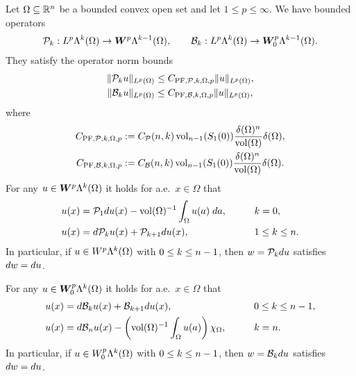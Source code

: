 \documentclass[10pt,a4paper]{article}
\begin{document}
\begin{theorem}\label{theorem:bogovpoinc}
    Let $\Omega \subseteq {\mathbb R}^{n}$ be a bounded convex open set and let $1 \leq p \leq \infty$. 
    We have bounded operators 
    \begin{align*}
        {\mathcal P}_{k} : L^{p}\Lambda^{k}(\Omega) \rightarrow \bm{W}^{p}\Lambda^{k-1}(\Omega)
        ,
        \qquad 
        {\mathcal B}_{k} : L^{p}\Lambda^{k}(\Omega) \rightarrow \bm{W}^{p}_{0}\Lambda^{k-1}(\Omega)
        .
    \end{align*}
    They satisfy the operator norm bounds 
    \begin{align*}
        \| {\mathcal P}_{k} u \|_{L^{p}(\Omega)}
        &\leq 
        C_{{{\rm PF}},{\mathcal P},k,\Omega,p}
        \| u \|_{L^{p}(\Omega)}
        ,
        \\
        \| {\mathcal B}_{k} u \|_{L^{p}(\Omega)}
        &\leq 
        C_{{{\rm PF}},{\mathcal B},k,\Omega,p}
        \| u \|_{L^{p}(\Omega)}
        ,
    \end{align*}
    where 
    \begin{align}
        C_{{{\rm PF}},{\mathcal P},k,\Omega,p} &:= C_{{\mathcal P}}(n,k) \operatorname{vol}_{n-1}(S_{1}(0)) \frac{{\delta}(\Omega)^{n}}{\operatorname{vol}(\Omega)} {\delta}(\Omega)
        ,
        \\
        C_{{{\rm PF}},{\mathcal B},k,\Omega,p} &:= C_{{\mathcal B}}(n,k) \operatorname{vol}_{n-1}(S_{1}(0)) \frac{{\delta}(\Omega)^{n}}{\operatorname{vol}(\Omega)} {\delta}(\Omega)
        .
    \end{align}
    For any $u \in \bm{W}^{p}\Lambda^{k}(\Omega)$ it holds for a.e.\ $x \in \Omega$ that 
    \begin{alignat}{4}
        u(x) &= {\mathcal P}_{1} d u(x) - \operatorname{vol}(\Omega)^{-1} \int_\Omega u(a) \;da, && \qquad k = 0,
        \label{math:theorem:bogovpoinc:poincare:zero}
        \\
        u(x) &= d {\mathcal P}_{k} u(x) + {\mathcal P}_{k+1} d u(x),        && \qquad 1 \leq k \leq n.
        \label{math:theorem:bogovpoinc:poincare:k}    
    \end{alignat}
    In particular, if $u \in W^{p}    \Lambda^{k}(\Omega)$ with $0 \leq k \leq n-1$, then $w = {\mathcal P}_{k} d u$ satisfies $d w = d u$.
    
    For any $u \in \bm{W}^{p}_{0}\Lambda^{k}(\Omega)$ it holds for a.e.\ $x \in \Omega$ that 
    \begin{alignat}{4}
        u(x) &= d {\mathcal B}_{k} u(x) + {\mathcal B}_{k+1} d u(x),
        \qquad && 0 \leq k \leq n-1,
        \label{math:theorem:bogovpoinc:bogov:k}
        \\
        u(x) &= d {\mathcal B}_{n} u(x) - \left( \operatorname{vol}(\Omega)^{-1} \int_{\Omega} u(a) \right) \chi_{\Omega},
        \qquad && k=n.
        \label{math:theorem:bogovpoinc:bogov:n}
    \end{alignat}
    In particular, if $u \in W^{p}_{0}\Lambda^{k}(\Omega)$ with $0 \leq k \leq n-1$, then $w = {\mathcal B}_{k} d u$ satisfies $d w = d u$.
    

\end{theorem}
\end{document}
